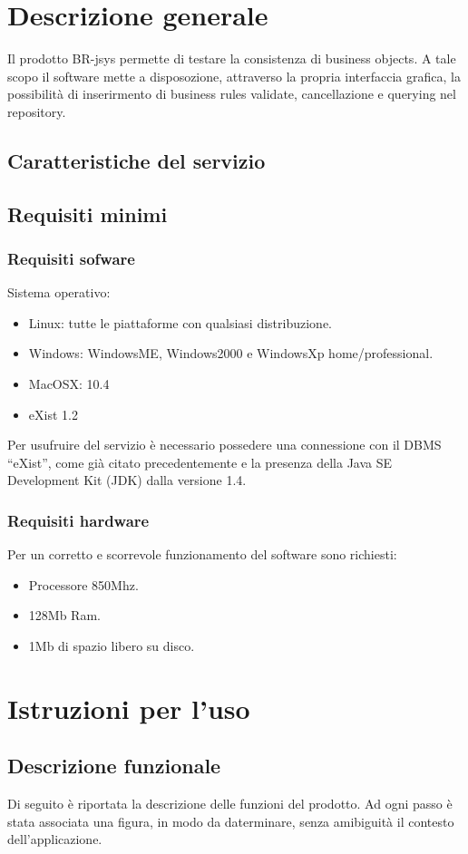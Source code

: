 \chapter{Descrizione generale}
Il prodotto BR-jsys permette di testare la consistenza di business objects. A tale scopo il software mette a disposozione, attraverso la propria interfaccia grafica, la possibilità di inserirmento di business rules validate, cancellazione e querying nel repository.


\section{Caratteristiche del servizio}

\section{Requisiti minimi}
\subsection{Requisiti sofware}
Sistema operativo:
\begin{itemize}
\item Linux: tutte le piattaforme con qualsiasi distribuzione.
\item Windows: WindowsME, Windows2000 e WindowsXp home/professional.
\item MacOSX: 10.4
\item eXist 1.2
\end{itemize}
Per usufruire del servizio \`e necessario possedere una connessione con il DBMS ``eXist'', come gi\`a citato precedentemente e la presenza della Java SE Development Kit (JDK) dalla versione 1.4.
\subsection{Requisiti hardware}
Per un corretto e scorrevole funzionamento del software sono richiesti:
\begin{itemize}
\item Processore 850Mhz.
\item 128Mb Ram.
\item 1Mb di spazio libero su disco.
\end{itemize}

\chapter{Istruzioni per l'uso}
\section{Descrizione funzionale}
Di seguito \`e riportata la descrizione delle funzioni del prodotto. Ad ogni passo \`e stata associata una figura, in modo da daterminare, senza amibiguit\`a il contesto dell'applicazione.
